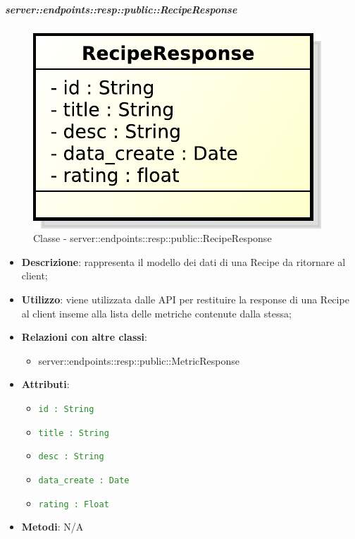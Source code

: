     \subparagraph{server::endpoints::resp::public::RecipeResponse} %
    \label{subp:bdsm_app_server_endpoints_resp_private_reciperesponse}
	\begin{figure}[!htbp]
		\centering
		\centerline{\includegraphics[scale=0.6]{./images/server/classes/endpoints/recipe_response.pdf}}
		\caption{Classe - server::endpoints::resp::public::RecipeResponse}
	\end{figure}
    \begin{itemize}
      \item \textbf{Descrizione}: rappresenta il modello dei dati di una Recipe da ritornare al client;
      \item \textbf{Utilizzo}: viene utilizzata dalle API per restituire la response di una Recipe al client inseme alla lista delle metriche contenute dalla stessa;
      \item \textbf{Relazioni con altre classi}:
        \begin{itemize}
        \item server::endpoints::resp::public::MetricResponse
    \end{itemize}
    \item \textbf{Attributi}:
      \begin{itemize}
        \item \textcolor{forestgreen}{\texttt{id : String}}
        \item \textcolor{forestgreen}{\texttt{title : String}}
        \item \textcolor{forestgreen}{\texttt{desc : String}}
        \item \textcolor{forestgreen}{\texttt{data\_create : Date}}
        \item \textcolor{forestgreen}{\texttt{rating : Float}}
      \end{itemize}
    \item \textbf{Metodi}: N/A
      \end{itemize}


